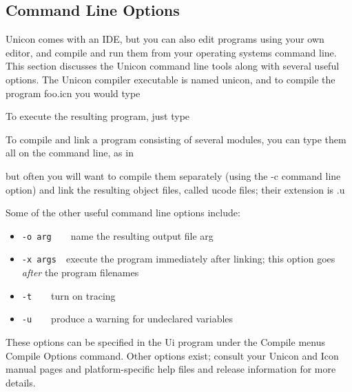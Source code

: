 \subsection{Command Line Options}

Unicon comes with an IDE, but you can also edit programs using your own
editor, and compile and run them from your operating
system{\textquotesingle}s command line. This section discusses the
Unicon command line tools along with several useful options. The Unicon
compiler executable is named unicon, and to compile the program foo.icn
you would type


\noindent To execute the resulting program, just type


To compile and link a program consisting of several modules, you can
type them all on the command line, as in


\noindent but often you will want to compile them separately
(using the -c command line option) and link the resulting object
files, called ucode files; their extension is .u


Some of the other useful command line options include:

\begin{itemize}
\item \texttt{{}-o arg}\ \ \ \ name the resulting output file arg
\item \texttt{{}-x args}\ \ execute the program immediately after linking;
		 this option goes \textit{after} the program filenames
\item \texttt{{}-t}\ \ \ \ turn on tracing
\item \texttt{{}-u}\ \ \ \ produce a warning for undeclared variables
\end{itemize}

These options can be specified in the Ui program under the Compile
menu{\textquotesingle}s Compile Options command. Other options exist;
consult your Unicon and Icon manual pages and platform-specific help
files and release information for more details.

